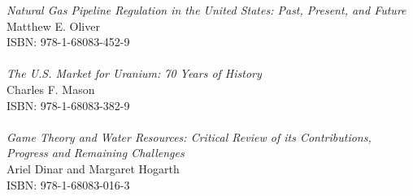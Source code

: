\vspace{12pt}
\vspace{12pt}
\noindent \textit{Natural Gas Pipeline Regulation in the United States: Past, Present, and Future}\\
Matthew E. Oliver
\\ISBN: 978-1-68083-452-9
\\
\\
\noindent \textit{The U.S. Market for Uranium: 70 Years of History}\\
Charles F. Mason
\\ISBN: 978-1-68083-382-9
\\
\\
\noindent \textit{Game Theory and Water Resources: Critical Review of its Contributions, Progress and Remaining Challenges}\\
Ariel Dinar and Margaret Hogarth
\\ISBN: 978-1-68083-016-3

